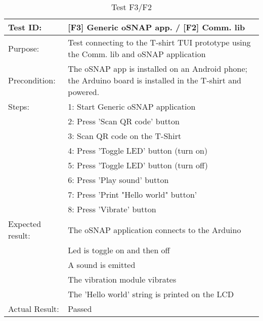 \begin{table}[h!]
\begin{tabular}{|l|p{10cm}|}
\hline Test ID: &		[F3] Generic oSNAP app. / [F2] Comm. lib \\
\hline Purpose: &		Test connecting to the T-shirt TUI prototype using the
						Comm. lib and oSNAP application \\
\hline Precondition: &	The oSNAP app is installed on an Android phone; the
						Arduino board is installed in the T-shirt and powered. \\
\hline
Steps:
 & 1: Start Generic oSNAP application \\
 & 2: Press 'Scan QR code' button \\
 & 3: Scan QR code on the T-Shirt \\
 & 4: Press 'Toggle LED' button (turn on) \\
 & 5: Press 'Toggle LED' button (turn off) \\
 & 6: Press 'Play sound' button \\
 & 7: Press 'Print "Hello world" button' \\
 & 8: Press 'Vibrate' button \\
\hline
Expected result:
 & The oSNAP application connects to the Arduino \\
 & Led is toggle on and then off \\
 & A sound is emitted \\
 & The vibration module vibrates \\
 & The 'Hello world' string is printed on the LCD \\
\hline
Actual Result:
 & Passed \\
\hline
\end{tabular}
\caption{Test F3/F2}
\end{table}


